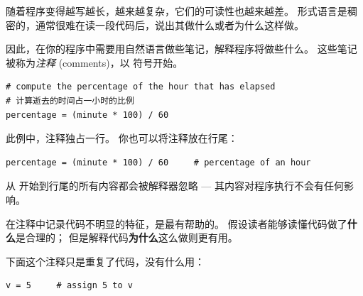 
随着程序变得越写越长，越来越复杂，它们的可读性也越来越差。 形式语言是稠密的，通常很难在读一段代码后，说出其做什么或者为什么这样做。

因此，在你的程序中需要用自然语言做些笔记，解释程序将做些什么。 这些笔记被称为{\em 注释} (comments)，以 \li{#} 符号开始。

\begin{lstlisting}
# compute the percentage of the hour that has elapsed
# 计算逝去的时间占一小时的比例
percentage = (minute * 100) / 60
\end{lstlisting}

%

此例中，注释独占一行。 你也可以将注释放在行尾：

\begin{lstlisting}
percentage = (minute * 100) / 60     # percentage of an hour
\end{lstlisting}

%

从 \li{#} 开始到行尾的所有内容都会被解释器忽略 — 其内容对程序执行不会有任何影响。


在注释中记录代码不明显的特征，是最有帮助的。 假设读者能够读懂代码做了{\bf 什么}是合理的； 但是解释代码\textbf{为什么}这么做则更有用。


下面这个注释只是重复了代码，没有什么用：

\begin{lstlisting}
v = 5     # assign 5 to v
\end{lstlisting}

